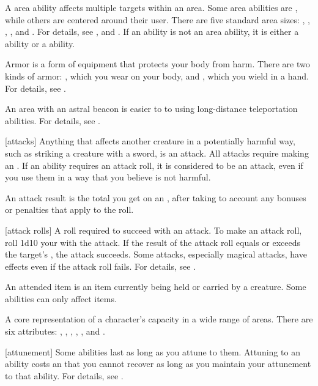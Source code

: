  A area ability affects multiple targets within an area.
Some area abilities are , while others are centered around their user.
There are five standard area sizes: \smallarea, \medarea, \largearea, \hugearea, and \gargarea.
For details, see , and .
If an ability is not an area ability, it is either a  ability or a  ability.

 Armor is a form of equipment that protects your body from harm.
There are two kinds of armor: , which you wear on your body, and , which you wield in a hand.
For details, see .

 An area with an astral beacon is easier to  to using long-distance teleportation abilities.
For details, see .

[attacks] Anything that affects another creature in a potentially harmful way, such as striking a creature with a sword, is an attack.
All attacks require making an .
If an ability requires an attack roll, it is considered to be an attack, even if you use them in a way that you believe is not harmful.

 An attack result is the total you get on an , after taking to account any bonuses or penalties that apply to the roll.

[attack rolls] A roll required to succeed with an attack.
To make an attack roll, roll 1d10 \add your  with the attack.
If the result of the attack roll equals or exceeds the target's , the attack succeeds.
Some attacks, especially magical attacks, have effects even if the attack roll fails.
For details, see .

 An attended item is an item currently being held or carried by a creature.
Some abilities can only affect  items.

 A core representation of a character's capacity in a wide range of areas. There are six attributes: , , , , , and .

[attunement] Some abilities last as long as you attune to them.
Attuning to an ability costs an  that you cannot recover as long as you maintain your attunement to that ability.
For details, see .

